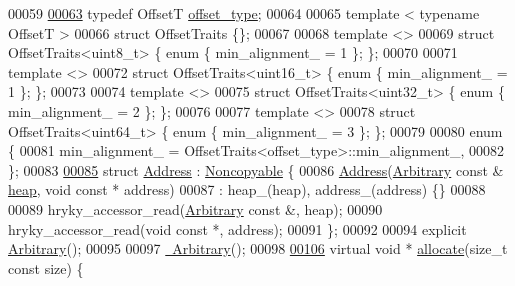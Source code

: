 \begin{DoxyCode}
00059 
\hypertarget{memory__heap__arbitrary_8h_source_l00063}{}\hyperlink{classhryky_1_1memory_1_1heap_1_1_arbitrary_a93027662f345b66e738ce8b2c9293e94}{00063}     \textcolor{keyword}{typedef} OffsetT             \hyperlink{classhryky_1_1memory_1_1heap_1_1_arbitrary_a93027662f345b66e738ce8b2c9293e94}{offset_type};
00064 
00065     \textcolor{keyword}{template} < \textcolor{keyword}{typename} OffsetT >
00066     \textcolor{keyword}{struct }OffsetTraits \{\};
00067 
00068     \textcolor{keyword}{template} <>
00069     \textcolor{keyword}{struct }OffsetTraits<uint8\_t> \{ \textcolor{keyword}{enum} \{ min\_alignment\_ = 1 \}; \};
00070 
00071     \textcolor{keyword}{template} <>
00072     \textcolor{keyword}{struct }OffsetTraits<uint16\_t> \{ \textcolor{keyword}{enum} \{ min\_alignment\_ = 1 \}; \};
00073     
00074     \textcolor{keyword}{template} <>
00075     \textcolor{keyword}{struct }OffsetTraits<uint32\_t> \{ \textcolor{keyword}{enum} \{ min\_alignment\_ = 2 \}; \};
00076     
00077     \textcolor{keyword}{template} <>
00078     \textcolor{keyword}{struct }OffsetTraits<uint64\_t> \{ \textcolor{keyword}{enum} \{ min\_alignment\_ = 3 \}; \};
00079     
00080     \textcolor{keyword}{enum} \{
00081         min\_alignment\_ = OffsetTraits<offset\_type>::min\_alignment\_,
00082     \};
00083 
\hypertarget{memory__heap__arbitrary_8h_source_l00085}{}\hyperlink{structhryky_1_1memory_1_1heap_1_1_arbitrary_1_1_address}{00085}     \textcolor{keyword}{struct }\hyperlink{structhryky_1_1memory_1_1heap_1_1_arbitrary_1_1_address}{Address} : \hyperlink{classhryky_1_1_noncopyable}{Noncopyable} \{
00086         \hyperlink{structhryky_1_1memory_1_1heap_1_1_arbitrary_1_1_address}{Address}(\hyperlink{classhryky_1_1memory_1_1heap_1_1_arbitrary}{Arbitrary} \textcolor{keyword}{const} & \hyperlink{namespacehryky_1_1memory_1_1global_a6fc6103f67c837aa0f39b359588409cd}{heap}, \textcolor{keywordtype}{void} \textcolor{keyword}{const} * address)
00087             : heap\_(heap), address\_(address) \{\}
00088 
00089         hryky\_accessor\_read(\hyperlink{classhryky_1_1memory_1_1heap_1_1_arbitrary}{Arbitrary} \textcolor{keyword}{const} &, heap);
00090         hryky\_accessor\_read(\textcolor{keywordtype}{void} \textcolor{keyword}{const} *, address);
00091     \};
00092 
00094     \textcolor{keyword}{explicit} \hyperlink{classhryky_1_1memory_1_1heap_1_1_arbitrary_aea108b28a19e3cd537c4c02bc4d032e0}{Arbitrary}();
00095 
00097     \hyperlink{classhryky_1_1memory_1_1heap_1_1_arbitrary_a836e315fb69fb1b7ea39869484d0229c}{~Arbitrary}();
00098 
\hypertarget{memory__heap__arbitrary_8h_source_l00106}{}\hyperlink{classhryky_1_1memory_1_1heap_1_1_arbitrary_a9ea505daf2fab84a93059dbda040602d}{00106}     \textcolor{keyword}{virtual} \textcolor{keywordtype}{void} * \hyperlink{classhryky_1_1memory_1_1heap_1_1_arbitrary_a9ea505daf2fab84a93059dbda040602d}{allocate}(\textcolor{keywordtype}{size\_t} \textcolor{keyword}{const} size) \{

\end{DoxyCode}
